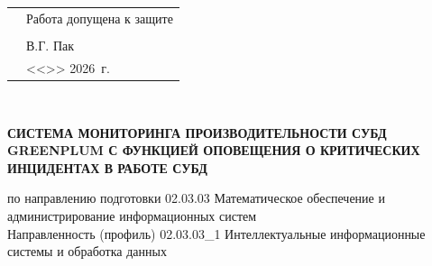 \thispagestyle{empty}%
\makeatletter
{}
%
\makeatother




{\centering%
	\Ministry\\
	\SPbPU\\
	{%
		\institute}
\par}%


\vspace{0pt plus1fill} %


\noindent
\begin{minipage}{\linewidth}
	\vspace{\mfloatsep} %
	\begin{tabularx}{\linewidth}{Xl}
	&Работа допущена к защите     \\
	&\HeadTitle     \\			
	&\underline{\hspace*{0.1\textheight}} В.Г. Пак    \\
	&<<\underline{\hspace*{0.05\textheight}}>> \underline{\hspace*{0.1\textheight}} 2026~г.  \\ 
	\end{tabularx}
	\vspace{\mfloatsep} %
\end{minipage}


\vspace{0pt plus2fill} %


{\centering%
	
	\MakeUppercase{\bfseries{}\DocType} \\ 
	\MakeUppercase{\normalfont{}\thesisDegree}%


{\centering%
	\MakeUppercase{\bfseries{Система мониторинга производительности СУБД Greenplum с функцией оповещения о критических инцидентах в работе СУБД}}}%

}\par%

\noindent	по направлению подготовки 02.03.03 Математическое обеспечение и администрирование информационных систем \\%
\noindent	Направленность (профиль)	02.03.03\_1 Интеллектуальные информационные системы и обработка данных %
\par%





